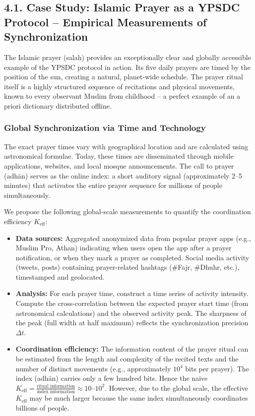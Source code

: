 \documentclass[12pt,a4paper]{article}
\newcommand{\Keff}{K_{\mathrm{eff}}}   %
\begin{document}
	\subsection{4.1. Case Study: Islamic Prayer as a YPSDC Protocol – Empirical Measurements of Synchronization}
	\label{subsec:islamic_prayer}
	
	The Islamic prayer (salah) provides an exceptionally clear and globally accessible example of the YPSDC protocol in action. Its five daily prayers are timed by the position of the sun, creating a natural, planet‑wide schedule. The prayer ritual itself is a highly structured sequence of recitations and physical movements, known to every observant Muslim from childhood – a perfect example of an a priori dictionary distributed offline.
	
	\subsubsection{Global Synchronization via Time and Technology}
	The exact prayer times vary with geographical location and are calculated using astronomical formulae. Today, these times are disseminated through mobile applications, websites, and local mosque announcements. The call to prayer (adhān) serves as the online index: a short auditory signal (approximately 2–5 minutes) that activates the entire prayer sequence for millions of people simultaneously.
	
	We propose the following global‑scale measurements to quantify the coordination efficiency \(\Keff\):
	\begin{itemize}
		\item \textbf{Data sources:} Aggregated anonymized data from popular prayer apps (e.g., Muslim Pro, Athan) indicating when users open the app after a prayer notification, or when they mark a prayer as completed. Social media activity (tweets, posts) containing prayer‑related hashtags (\#Fajr, \#Dhuhr, etc.), timestamped and geolocated.
		\item \textbf{Analysis:} For each prayer time, construct a time series of activity intensity. Compute the cross‑correlation between the expected prayer start time (from astronomical calculations) and the observed activity peak. The sharpness of the peak (full width at half maximum) reflects the synchronization precision \(\Delta t\).
		\item \textbf{Coordination efficiency:} The information content of the prayer ritual can be estimated from the length and complexity of the recited texts and the number of distinct movements (e.g., approximately \(10^4\) bits per prayer). The index (adhān) carries only a few hundred bits. Hence the naive \(\Keff = \frac{\text{ritual information}}{\text{index information}} \approx 10\)–\(10^2\). However, due to the global scale, the effective \(\Keff\) may be much larger because the same index simultaneously coordinates billions of people.
	\end{itemize}
	
\end{document}
